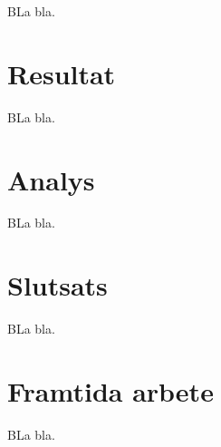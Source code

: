 \documentclass{article}
\begin{document}
BLa bla.


\section*{Resultat}

BLa bla.


\section*{Analys}

BLa bla.


\section*{Slutsats}

BLa bla.


\section*{Framtida arbete}

BLa bla.


\printbibliography
\end{document}
